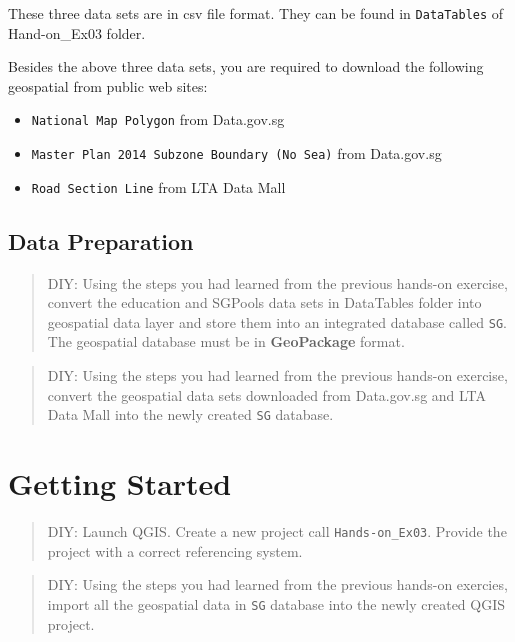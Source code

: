 \documentclass[
  letterpaper,
  DIV=11,
  numbers=noendperiod]{scrreprt}
\providecommand{\tightlist}{%
  \setlength{\itemsep}{0pt}\setlength{\parskip}{0pt}}\usepackage{longtable,booktabs,array}
\begin{document}
These three data sets are in csv file format. They can be found in
\texttt{DataTables} of Hand-on\_Ex03 folder.

Besides the above three data sets, you are required to download the
following geospatial from public web sites:

\begin{itemize}
\tightlist
\item
  \texttt{National\ Map\ Polygon} from Data.gov.sg
\item
  \texttt{Master\ Plan\ 2014\ Subzone\ Boundary\ (No\ Sea)} from
  Data.gov.sg
\item
  \texttt{Road\ Section\ Line} from LTA Data Mall
\end{itemize}

\hypertarget{data-preparation-1}{%
\subsection{Data Preparation}\label{data-preparation-1}}

\begin{quote}
DIY: Using the steps you had learned from the previous hands-on
exercise, convert the education and SGPools data sets in DataTables
folder into geospatial data layer and store them into an integrated
database called \texttt{SG}. The geospatial database must be in
\textbf{GeoPackage} format.
\end{quote}

\begin{quote}
DIY: Using the steps you had learned from the previous hands-on
exercise, convert the geospatial data sets downloaded from Data.gov.sg
and LTA Data Mall into the newly created \texttt{SG} database.
\end{quote}

\hypertarget{getting-started-1}{%
\section{Getting Started}\label{getting-started-1}}

\begin{quote}
DIY: Launch QGIS. Create a new project call \texttt{Hands-on\_Ex03}.
Provide the project with a correct referencing system.
\end{quote}

\begin{quote}
DIY: Using the steps you had learned from the previous hands-on
exercies, import all the geospatial data in \texttt{SG} database into
the newly created QGIS project.
\end{quote}
\end{document}
